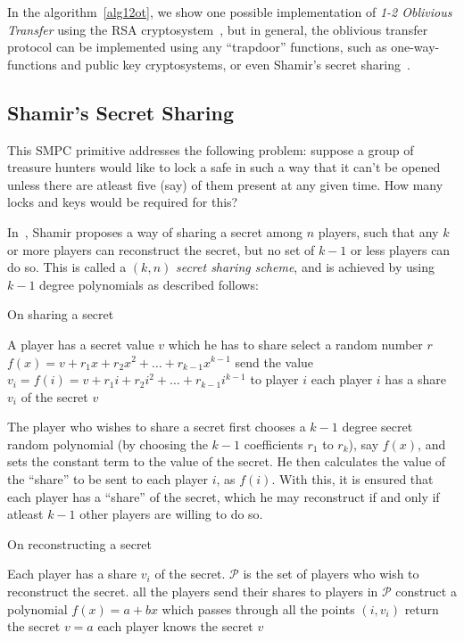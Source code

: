 In the algorithm~\ref{alg12ot}, we show one possible implementation of 
\emph{1-2 Oblivious Transfer} using the RSA cryptosystem~\cite{RSA78:AMfODSaPKC},
	but in general, the oblivious transfer protocol can be implemented using
	any ``trapdoor'' functions, such as one-way-functions and public key
	cryptosystems, or even Shamir's secret sharing~\cite{SSR08:APfGOT}.

\subsection{Shamir's Secret Sharing}
\label{sec:sss-prim}
This SMPC primitive addresses the following problem: suppose a group of
treasure hunters would like to lock a safe in such a way that it can't 
be opened unless there are atleast five (say) of them present at any given time. 
How many locks and keys would be required for this?

In~\cite{S79:HtSaS}, Shamir proposes a way of sharing a secret among $n$ 
players, such that any $k$ or more players can reconstruct the secret,
but no set of $k-1$ or less players can do so. This is called a $(k,n)$ 
{\it secret sharing scheme}, and is achieved by using $k-1$ degree polynomials
as described follows: 

\begin{algorithm}
\caption{On sharing a secret}
\label{algshare}
\begin{algorithmic}
\REQUIRE A player has a secret value $v$ which he has to share
\STATE select a random number $r$
\STATE $f(x) = v + r_{1}x + r_{2}x^{2} + \ldots + r_{k-1}x^{k-1}$
	\STATE send the value $v_{i}= f(i) = v + r_{1}i + r_{2}i^{2} + \ldots + r_{k-1}i^{k-1}$ to player $i$
\ENDFOR
\ENSURE each player $i$ has a share $v_{i}$ of the secret $v$
\end{algorithmic}
\end{algorithm}

The player who wishes to share a secret first chooses a $k-1$ degree
secret random polynomial (by choosing the $k-1$ coefficients $r_1$ to $r_k$),
say $f(x)$,
and sets the constant term to the value of the secret. He then calculates
the value of the ``share'' to be sent to each player $i$, as $f(i)$. With
this, it is ensured that each player has a ``share'' of the secret, which
he may reconstruct if and only if atleast $k-1$ other players are willing
to do so.


\begin{algorithm}
\caption{On reconstructing a secret}
\label{algrecon}
\begin{algorithmic}
\REQUIRE Each player has a share $v_{i}$ of the secret.
	$\mathcal{P}$ is the set of players who wish to reconstruct the secret.
	\STATE all the players send their shares to players in $\mathcal{P}$
\ENDFOR
{}
	\STATE construct a polynomial $f(x) = a + bx$ which passes through all the points $(i,v_{i})$
	\STATE return the secret $v = a$
\ENDFOR
\ENSURE each player knows the secret $v$
\end{algorithmic}
\end{algorithm}

